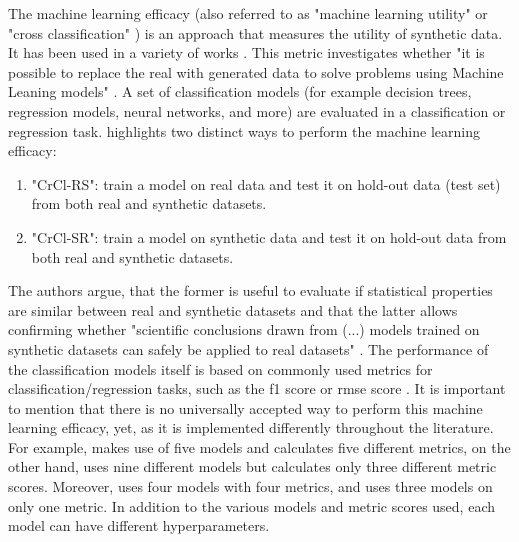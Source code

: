 The machine learning efficacy (also referred to as "machine learning utility" \cite{zhang2021GANBLRTabularData} or "cross classification" \cite{goncalves2020GenerationEvaluationSynthetic}) is an approach that measures the utility of synthetic data. 
It has been used in a variety of works \cite{zhao2022CTABGANEnhancingTabular, xu2019ModelingTabularData, zhang2021GANBLRTabularData, bourou2021ReviewTabularData, ge2021KaminoConstraintawareDifferentially}.
This metric investigates whether "it is possible to replace the real with generated data to solve problems using Machine Leaning models" \cite[p. 7]{bourou2021ReviewTabularData}.
A set of classification models (for example decision trees, regression models, neural networks, and more) are evaluated in a classification or regression task.
\newpage
\textcite[p. 7]{goncalves2020GenerationEvaluationSynthetic} highlights two distinct ways to perform the machine learning efficacy:
\begin{enumerate}
  \item "CrCl-RS": train a model on real data and test it on hold-out data (test set) from both real and synthetic datasets.
  \item "CrCl-SR": train a model on synthetic data and test it on hold-out data from both real and synthetic datasets.
\end{enumerate}
The authors argue, that the former is useful to evaluate if statistical properties are similar between real and synthetic datasets
and that the latter allows confirming whether "scientific conclusions drawn from (...) models trained on synthetic datasets can safely be applied to real datasets" \cite[p. 7]{goncalves2020GenerationEvaluationSynthetic}.
The performance of the classification models itself is based on commonly used metrics for classification/regression tasks, such as the f1 score or \gls{rmse} score \cite{bourou2021ReviewTabularData, chundawat2022UniversalMetricRobust}.
It is important to mention that there is no universally accepted way to perform this machine learning efficacy, yet, as it is implemented differently throughout the literature.
For example, \cite{zhao2022CTABGANEnhancingTabular} makes use of five models and calculates five different metrics, 
\cite{ge2021KaminoConstraintawareDifferentially} on the other hand, uses nine different models but calculates only three different metric scores.
Moreover, \cite{kunar2021DTGANDifferentialPrivatea} uses four models with four metrics, and \cite{kim2021OCTGANNeuralODEbased} uses three models on only one metric.
In addition to the various models and metric scores used, each model can have different hyperparameters.
